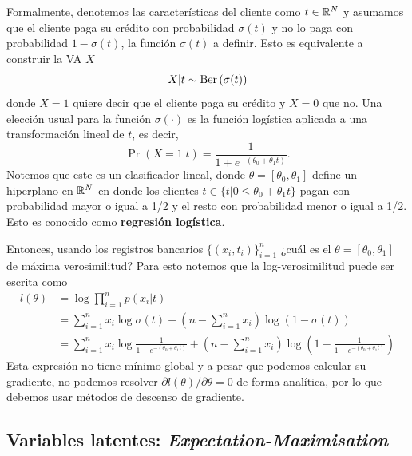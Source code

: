 Formalmente, denotemos las características del cliente como $t\in{\mathbb R}^N$ y asumamos que el cliente paga su crédito con probabilidad $\sigma(t)$ y no lo paga con probabilidad $1- \sigma(t)$, la función $\sigma(t)$ a definir. Esto es equivalente a construir la VA $X$
\begin{equation}
 	X|t \sim \text{Ber}\left(\sigma(t)\right)
 \end{equation} 
 donde $X=1$ quiere decir que el cliente paga su crédito y $X=0$ que no. Una elección usual para la función $\sigma(\cdot)$ es la función logística aplicada a una transformación lineal de $t$, es decir, 
 \begin{equation}
 	\Pr{(X=1|t)} = \frac{1}{1+e^{-(\theta_0 + \theta_1 t)	}}.
 \end{equation}
Notemos que este es un clasificador lineal, donde $\theta = [\theta_0, \theta_1]$ define un hiperplano en ${\mathbb R}^N$ en donde los clientes $t\in\{t | 0\leq \theta_0 + \theta_1 t\}$ pagan con probabilidad mayor o igual a 1/2 y el resto con probabilidad menor o igual a 1/2. Esto es conocido como \textbf{regresión logística}. 

Entonces, usando los registros bancarios $\{(x_i,t_i)\}_{i=1}^n$ ¿cuál es el $\theta = [\theta_0, \theta_1]$ de máxima verosimilitud? Para esto notemos que la log-verosimilitud puede ser escrita como 
\begin{align*}
	l(\theta) &= \log \prod_{i=1}^n p(x_i|t) \\
			  &= \sum_{i=1}^n x_i \log \sigma(t) + \left(n-\sum_{i=1}^n x_i\right)\log(1-\sigma(t))\\
			  &= \sum_{i=1}^n x_i \log \frac{1}{1+e^{-(\theta_0 + \theta_1 t)	}} + \left(n-\sum_{i=1}^n x_i\right)\log(1-\frac{1}{1+e^{-(\theta_0 + \theta_1 t)	}})
\end{align*}
Esta expresión no tiene mínimo global y a pesar que podemos calcular su gradiente, no podemos resolver $\partial l(\theta)/\partial \theta =0$ de forma analítica, por lo que debemos usar métodos de descenso de gradiente.  

\subsection{Variables latentes: \textit{Expectation-Maximisation}} 
\label{sub:EM}

